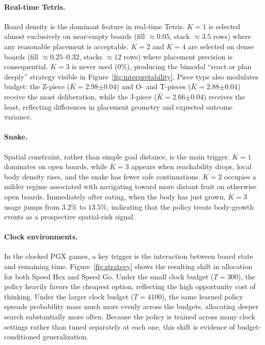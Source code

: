\documentclass{article}
\begin{document}
\paragraph{Real-time Tetris.}

Board density is the dominant feature in real-time Tetris.
$K{=}1$ is selected almost exclusively on near-empty boards
(fill $\approx 0.05$, stack $\approx 3.5$ rows) where any reasonable placement is
acceptable.
$K{=}2$ and $K{=}4$ are selected on dense boards (fill $\approx 0.25$--$0.32$,
stacks $\approx 12$ rows) where placement precision is consequential.
$K{=}3$ is never used ($0\%$), producing the bimodal ``react or plan deeply'' strategy
visible in Figure~\ref{fig:interpretability}.
Piece type also modulates budget: the Z-piece ($\bar{K}{=}2.98{\scriptstyle\pm0.04}$)
and O- and T-pieces ($\bar{K}{=}2.88{\scriptstyle\pm0.04}$) receive the most
deliberation, while the J-piece ($\bar{K}{=}2.66{\scriptstyle\pm0.04}$) receives the
least, reflecting differences in placement geometry and expected outcome variance.

\paragraph{Snake.}

Spatial constraint, rather than simple goal distance, is the main trigger.
$K{=}1$ dominates on open boards, while $K{=}3$ appears when reachability drops,
local body density rises, and the snake has fewer safe continuations. $K{=}2$
occupies a milder regime associated with navigating toward more distant fruit on
otherwise open boards. Immediately after eating, when the body has just grown,
$K{=}3$ usage jumps from $3.2\%$ to $13.5\%$, indicating that the policy treats
body-growth events as a prospective spatial-risk signal.

\paragraph{Clock environments.}

In the clocked PGX games, a key trigger is
the interaction between board state and remaining time. Figure~\ref{fig:strategy}
shows the resulting shift in allocation for both Speed Hex and Speed Go. Under the
small clock budget ($T{=}300$), the policy heavily favors the cheapest option,
reflecting the high opportunity cost of thinking. Under the larger clock budget
($T{=}4100$), the same learned policy spreads probability mass much more evenly
across the budgets, allocating deeper search substantially more often. Because
the policy is trained across many clock settings rather than tuned separately at
each one, this shift is evidence of budget-conditioned generalization.
\end{document}
